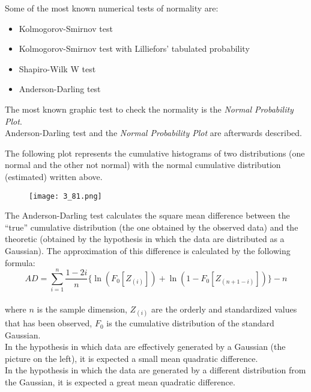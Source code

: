 \begin{frame}
  \vspace*{.25cm}
  Some of the most known numerical tests of normality are:
  \begin{itemize}
    \item Kolmogorov-Smirnov test
    \item Kolmogorov-Smirnov test with Lilliefors' tabulated probability
    \item Shapiro-Wilk W test
    \item Anderson-Darling test
  \end{itemize}
  \vspace*{.25cm}
  The most known graphic test to check the normality is the \textit{Normal Probability Plot}.\\
  \vspace*{.25cm}
  Anderson-Darling test and the \textit{Normal Probability Plot} are afterwards described. 
\end{frame}


\begin{frame}
  \vspace*{.25cm}
  The following plot represents the cumulative histograms of two distributions (one normal and the other not normal) with the normal cumulative distribution (estimated) written above.
  \begin{figure}
    \texttt{[image: 3\_81.png]}
  \end{figure}
\end{frame}

\begin{frame}
  \begin{small}
    \vspace*{.25cm}
    The Anderson-Darling test calculates the square mean difference between the ``true'' cumulative distribution (the one obtained by the observed data) and the theoretic (obtained by the hypothesis in which the data are distributed as a Gaussian). The approximation of this difference is calculated by the following formula:\\
    \vspace*{.25cm}
    $$ AD = \sum_{i=1}^n {\frac{1-2i}{n}}\{\ln(F_0[Z_{(i)}])+\ln(1-F_0[Z_{(n+1-i)}])\} - n $$\\
    \vspace*{.25cm}
    where $ n $ is the sample dimension, $ Z_{(i)} $ are the orderly and standardized values that has been observed, $ F_0 $ is the cumulative distribution of the standard Gaussian.\\
  \vspace*{.25cm}
  In the hypothesis in which data are effectively generated by a Gaussian (the picture on the left), it is expected a small mean quadratic difference.\\
  In the hypothesis in which the data are generated by a different distribution from the Gaussian, it is expected a great mean quadratic difference.                                                                                                                                               \end{small}
\end{frame}

